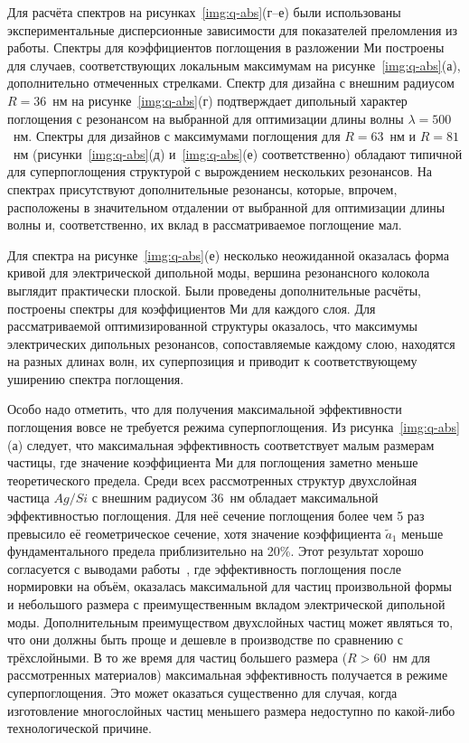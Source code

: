 Для расчёта спектров на рисунках~\ref{img:q-abs}(г--е) были
использованы экспериментальные дисперсионные зависимости для
показателей преломления из работы\cite{palik-1997}. Спектры для
коэффициентов поглощения в разложении Ми построены для случаев,
соответствующих локальным максимумам на рисунке~\ref{img:q-abs}(а),
дополнительно отмеченных стрелками.  Спектр для дизайна с внешним
радиусом $R=36$~нм на рисунке~\ref{img:q-abs}(г) подтверждает
дипольный характер поглощения с резонансом на выбранной для
оптимизации длины волны $\lambda=500$~нм.  Спектры для дизайнов с
максимумами поглощения для $R=63$~нм и $R=81$~нм
(рисунки~\ref{img:q-abs}(д) и~\ref{img:q-abs}(е) соответственно)
обладают типичной для суперпоглощения структурой с вырождением
нескольких резонансов. На спектрах присутствуют дополнительные
резонансы, которые, впрочем, расположены в значительном отдалении от
выбранной для оптимизации длины волны и, соответственно, их вклад в
рассматриваемое поглощение мал.

Для спектра на рисунке~\ref{img:q-abs}(е) несколько неожиданной
оказалась форма кривой для электрической дипольной моды, вершина
резонансного колокола выглядит практически плоской.  Были проведены
дополнительные расчёты, построены спектры для коэффициентов Ми для
каждого слоя. Для рассматриваемой оптимизированной структуры
оказалось, что максимумы электрических дипольных резонансов,
сопоставляемые каждому слою, находятся на разных длинах волн, их
суперпозиция и приводит к соответствующему уширению спектра
поглощения.

Особо надо отметить, что для получения максимальной эффективности
поглощения вовсе не требуется режима суперпоглощения.  Из
рисунка~\ref{img:q-abs}(а) следует, что максимальная эффективность
соответствует малым размерам частицы, где значение коэффициента Ми для
поглощения заметно меньше теоретического предела.  Среди всех
рассмотренных структур двухслойная частица $Ag/Si$ с внешним радиусом
36~нм обладает максимальной эффективностью поглощения.  Для неё
сечение поглощения более чем 5 раз превысило её геометрическое
сечение, хотя значение коэффициента $\tilde{a}_1$ меньше
фундаментального предела приблизительно на 20\%.  Этот результат
хорошо согласуется с выводами работы~\cite{Miller-2014}, где
эффективность поглощения после нормировки на объём, оказалась
максимальной для частиц произвольной формы и небольшого размера с
преимущественным вкладом электрической дипольной моды.  Дополнительным
преимуществом двухслойных частиц может являться то, что они должны
быть проще и дешевле в производстве по сравнению с трёхслойными.  В то
же время для частиц большего размера ($R>60$~нм для рассмотренных
материалов) максимальная эффективность получается в режиме
суперпоглощения.  Это может оказаться существенно для случая, когда
изготовление многослойных частиц меньшего размера недоступно по
какой-либо технологической причине.

